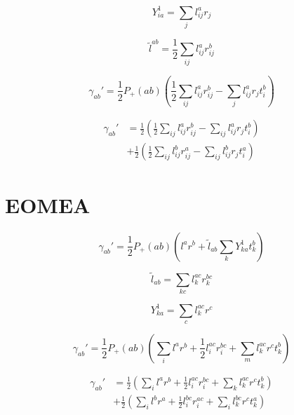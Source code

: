 \documentclass[aip,jcp,reprint,amsmath,amssymb,floatfix,citeautoscript,nofootinbib,onecolumn]{revtex4-2}
\begin{document}
\begin{equation}
	Y^1_{ia} = \sum_jl^a_{ij}r_j
\end{equation}

\begin{equation}
	\tilde{l}^{ab} = \frac{1}{2}\sum_{ij}l^a_{ij}r^b_{ij}
\end{equation}

\begin{equation}
	\gamma_{ab}'=\frac{1}{2}P_+(ab)\left(\frac{1}{2}\sum_{ij}l^a_{ij}r^b_{ij}-\sum_jl^a_{ij}r_jt^b_i\right)
\end{equation}

\begin{align}
	\gamma_{ab}'&=\frac{1}{2}\left(\frac{1}{2}\sum_{ij}l^a_{ij}r^b_{ij}-\sum_{ij}l^a_{ij}r_jt^b_i\right) \\
	&+\frac{1}{2}\left(\frac{1}{2}\sum_{ij}l^b_{ij}r^a_{ij}-\sum_{ij}l^b_{ij}r_jt^a_i\right)
\end{align}

\section{EOMEA}
\begin{equation}
	\gamma_{ab}'=\frac{1}{2}P_+(ab)\left(l^ar^b+\tilde{l}_{ab}\sum_kY^1_{ka}t^b_k\right)
\end{equation}

\begin{equation}
	\tilde{l}_{ab} = \sum_{kc}l^{ac}_kr^{bc}_k
\end{equation}

\begin{equation}
	Y^1_{ka}=\sum_cl^{ac}_kr^c
\end{equation}

\begin{equation}
	\gamma_{ab}' = \frac{1}{2}P_+(ab)\left(\sum_il^ar^b+\frac{1}{2}l^{ac}_{i}r^{bc}_{i}+\sum_ml^{ac}_{k}r^ct^b_k\right)
\end{equation}

\begin{align}
	\gamma_{ab}' &= \frac{1}{2}\left(\sum_il^ar^b+\frac{1}{2}l^{ac}_{i}r^{bc}_{i}+\sum_kl^{ac}_{k}r^ct^b_k\right) \\
	&+\frac{1}{2}\left(\sum_il^br^a+\frac{1}{2}l^{bc}_ir^{ac}_i+\sum_il^{bc}_kr^ct^a_k\right)
\end{align}
\end{document}

